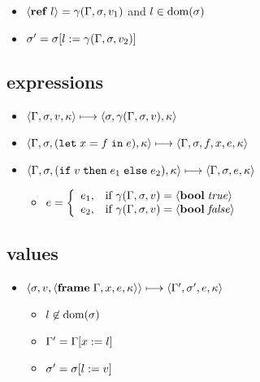 \documentclass{article}
\begin{document}
\begin{minipage}{\textwidth}
\begin{minipage}[t]{0.50\textwidth}
\begin{itemize}
\begin{itemize}
\item $\langle\mathbf{ref}\; l\rangle=\gamma(\Gamma,\sigma,v_1)$ and $l\in\operatorname{dom}(\sigma)$
\item $\sigma'=\sigma[l:= \gamma(\Gamma,\sigma,v_2)]$
\end{itemize}
\end{itemize}

\end{minipage}
\begin{minipage}[t]{0.50\textwidth}

\subsection{expressions}
\begin{itemize}
\item $\langle\Gamma,\sigma,v,\kappa\rangle \longmapsto \langle \sigma,\gamma(\Gamma,\sigma,v),\kappa \rangle$

\item $\langle\Gamma,\sigma,(\mathtt{let}\; x=f\; \mathtt{in}\; e),\kappa\rangle \longmapsto \langle\Gamma,\sigma,f,x, e, \kappa\rangle$

\item $\langle\Gamma,\sigma,(\mathtt{if}\; v\; \mathtt{then}\; e_1\; \mathtt{else}\; e_2),\kappa\rangle \longmapsto \langle\Gamma,\sigma, e, \kappa\rangle$

\begin{itemize}
  \item $\displaystyle e = \left\{\begin{array}{rl}
e_1, & \text{if } \gamma(\Gamma,\sigma,v) = \langle\mathbf{bool}\; \mathit{true}\rangle \\
e_2, & \text{if } \gamma(\Gamma,\sigma,v) = \langle\mathbf{bool}\; \mathit{false}\rangle
\end{array}\right.$

\end{itemize}
\end{itemize}

\subsection{values}

\begin{itemize}
\item $\langle\sigma,v,\langle\mathbf{frame}\; \Gamma,x,e,\kappa\rangle\rangle \longmapsto \langle\Gamma',\sigma',e,\kappa\rangle$
\begin{itemize}
\item $l\not\in\operatorname{dom}(\sigma)$
\item $\Gamma' = \Gamma[x:= l]$
\item $\sigma' = \sigma[l:= v]$
\end{itemize}
\end{itemize}


\end{minipage}
\end{minipage}
\end{document}
